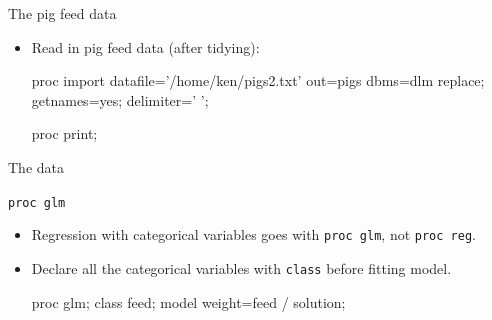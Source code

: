 \documentclass[unknownkeysallowed]{beamer}\usepackage[]{graphicx}\usepackage[]{color}
\begin{document}

\begin{frame}[fragile]{The pig feed data}
  
  \begin{itemize}
  \item Read in pig feed data (after tidying):
    
    \begin{Sascode}[store=muber]
proc import
  datafile='/home/ken/pigs2.txt'
  out=pigs
  dbms=dlm
  replace;
  getnames=yes;
  delimiter=' ';
  
proc print;
    \end{Sascode}
  \end{itemize}
  
\end{frame}

\begin{frame}[fragile]{The data}
  
\end{frame}

\begin{frame}[fragile]{\texttt{proc glm}}
  
  \begin{itemize}
  \item Regression with categorical variables goes with \texttt{proc
      glm}, not \texttt{proc reg}.
  \item Declare all the categorical variables with \texttt{class}
    before fitting model.
    
    \begin{Sascode}[store=kogep]
proc glm;
  class feed;
  model weight=feed / solution;
    \end{Sascode}
  \end{itemize}
\end{frame}
\end{document}
